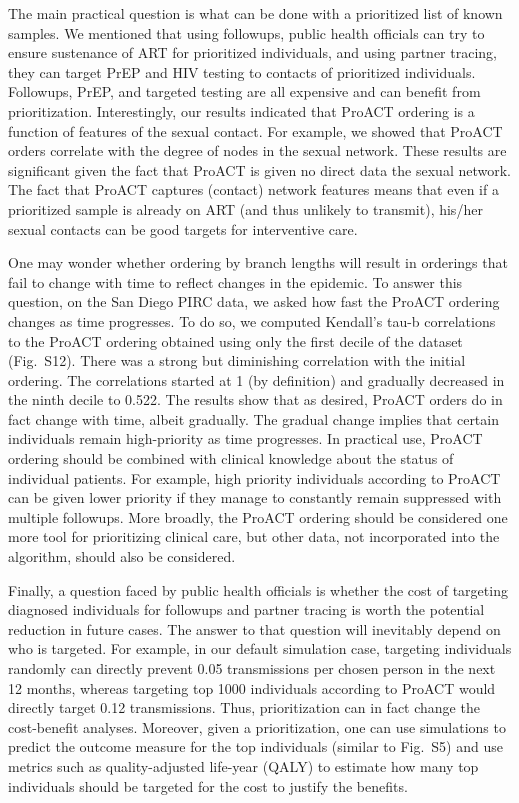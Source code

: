 \documentclass[oupdraft]{sysbio}
\newcommand{\PLWH}{sample\xspace}
\begin{document}
The main practical question  is what can be done with a prioritized list of known \PLWH{s}.
We mentioned that using followups, public health officials can try to ensure sustenance of ART for prioritized individuals, and using partner tracing, they can target PrEP and HIV testing to contacts of  prioritized individuals. Followups, PrEP, and targeted testing are all expensive and can benefit from prioritization. 
Interestingly, 
our results indicated that ProACT ordering is a function of features of the sexual contact. 
For example, we showed that ProACT orders correlate with the degree of nodes in the sexual network.
These results are significant given the fact that ProACT is given no direct data the sexual network. 
The fact that ProACT captures (contact) network features means that even if a prioritized \PLWH is already on ART (and thus unlikely to transmit), his/her sexual contacts can be good targets for interventive care. 


One may wonder whether ordering by branch lengths will result in orderings that fail to change with time to reflect changes in the epidemic.
To answer this question,
on the San Diego PIRC data, we asked how fast the  ProACT ordering changes as time progresses. To do so, we computed Kendall's tau-b correlations to the ProACT ordering obtained using only the first decile of the dataset (Fig.~S12). There was a strong but diminishing correlation with the initial ordering. The correlations started at 1 (by definition) and gradually decreased in the ninth decile to 0.522. 
The results show that as desired,  ProACT orders do in fact change with time, albeit gradually.
The gradual change implies that certain individuals remain high-priority as time progresses. 
In practical use, ProACT ordering should be combined with clinical knowledge about the status of individual patients. For example, high priority individuals according to ProACT can be given lower priority if they manage to constantly remain suppressed with multiple followups.
More broadly, the ProACT ordering should be considered one more tool for prioritizing clinical care, but other data, not incorporated into the algorithm, should also be considered. 

Finally, a question faced by public health officials is whether the cost of targeting diagnosed individuals for followups and partner tracing is worth the potential reduction in future cases. 
The answer to that question will inevitably depend on who is targeted.
For example, in our default simulation case, targeting individuals randomly can directly prevent 0.05 transmissions per chosen person  in the next 12 months, whereas targeting top 1000 individuals according to ProACT would directly target 0.12 transmissions. 
Thus, prioritization can in fact change the cost-benefit analyses. 
Moreover, given a prioritization, one can use simulations to predict the outcome measure for the top individuals (similar to Fig.~S5) and use metrics such as quality-adjusted life-year (QALY) to estimate how many top individuals should be targeted for the cost to justify the benefits.
\end{document}
